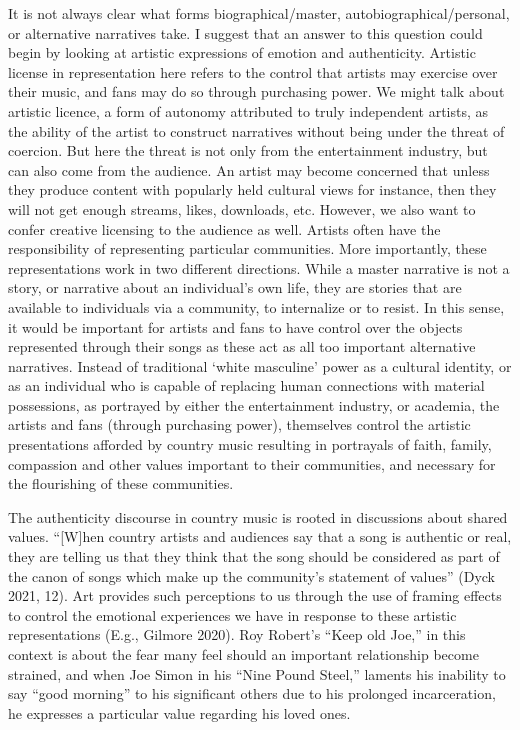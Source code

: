 \documentclass[12pt]{book}
\theoremstyle{definition}
\theoremstyle{remark}
\begin{document}
It is not always clear what forms biographical/master, autobiographical/personal, or alternative narratives take. I suggest that an answer to this question could begin by looking at artistic expressions of emotion and authenticity. Artistic license in representation here refers to the control that artists may exercise over their music, and fans may do so through purchasing power. We might talk about artistic licence, a form of autonomy attributed to truly independent artists, as the ability of the artist to construct narratives without being under the threat of coercion. But here the threat is not only from the entertainment industry, but can also come from the audience. An artist may become concerned that unless they produce content with popularly held cultural views for instance, then they will not get enough streams, likes, downloads, etc. However, we also want to confer creative licensing to the audience as well. Artists often have the responsibility of representing particular communities. More importantly, these representations work in two different directions. While a master narrative is not a story, or narrative about an individual's own life, they are stories that are available to individuals via a community, to internalize or to resist. In this sense, it would be important for artists and fans to have control over the objects represented through their songs as these act as all too important alternative narratives. Instead of traditional `white masculine' power as a cultural identity, or as an individual who is capable of replacing human connections with material possessions, as portrayed by either the entertainment industry, or academia, the artists and fans (through purchasing power), themselves control the artistic presentations afforded by country music resulting in portrayals of faith, family, compassion and other values important to their communities, and necessary for the flourishing of these communities.

The authenticity discourse in country music is rooted in discussions about shared values. ``{[}W{]}hen country artists and audiences say that a song is authentic or real, they are telling us that they think that the song should be considered as part of the canon of songs which make up the community's statement of values'' (Dyck 2021, 12). Art provides such perceptions to us through the use of framing effects to control the emotional experiences we have in response to these artistic representations (E.g., Gilmore 2020). Roy Robert's ``Keep old Joe,'' in this context is about the fear many feel should an important relationship become strained, and when Joe Simon in his ``Nine Pound Steel,'' laments his inability to say ``good morning'' to his significant others due to his prolonged incarceration, he expresses a particular value regarding his loved ones.
\end{document}
